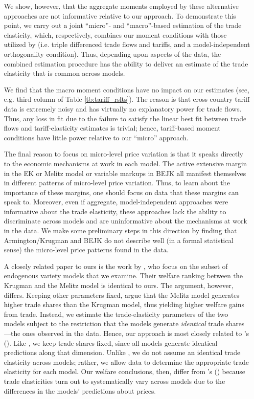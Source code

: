 \documentclass[12pt,dvips, ps2pdf]{article}
\def\citeapos#1{\citeauthor{#1}'s (\citeyear{#1})}
\begin{document}
We show, however, that the aggregate moments employed by these alternative approaches are not informative relative to our approach. To demonstrate this point, we carry out a joint ``micro''- and ``macro''-based estimation of the trade elasticity, which, respectively, combines our moment conditions with those utilized by \citet{caliendo2010} (i.e. triple differenced trade flows and tariffs, and a model-independent orthogonality condition). Thus, depending upon aspects of the data, the combined estimation procedure has the ability to deliver an estimate of the trade elasticity that is common across models.

We find that the macro moment conditions have no impact on our estimates (see, e.g. third column of Table \ref{tb:tariff_rslts}). The reason is that cross-country tariff data is extremely noisy and has virtually no explanatory power for trade flows. Thus, any loss in fit due to the failure to satisfy the linear best fit between trade flows and tariff-elasticity estimates is trivial; hence, tariff-based moment conditions have little power relative to our ``micro'' approach.

The final reason to focus on micro-level price variation is that it speaks directly to the economic mechanisms at work in each model. The active extensive margin in the EK or Melitz model or variable markups in BEJK all manifest themselves in different patterns of micro-level price variation. Thus, to learn about the importance of these margins, one should focus on data that these margins can speak to. Moreover, even if aggregate, model-independent approaches were informative about the trade elasticity, these approaches lack the ability to discriminate across models and are uninformative about the mechanisms at work in the data. We make some preliminary steps in this direction by finding that Armington/Krugman and BEJK do not describe well (in a formal statistical sense) the micro-level price patterns found in the data.

A closely related paper to ours is the work by \citet{melitz_redding}, who focus on the subset of endogenous variety models that we examine. Their welfare ranking between the Krugman and the Melitz model is identical to ours. The argument, however, differs. Keeping other parameters fixed, \citet{melitz_redding} argue that the Melitz model generates higher trade shares than the Krugman model, thus yielding higher welfare gains from trade. Instead, we estimate the trade-elasticity parameters of the two models subject to the restriction that the models generate \emph{identical} trade shares---the ones observed in the data. Hence, our approach is most closely related to \citeapos{acr09}. Like \citet{acr09}, we keep trade shares fixed, since all models generate identical predictions along that dimension. Unlike \citet{acr09}, we do not assume an identical trade elasticity across models; rather, we allow data to determine the appropriate trade elasticity for each model. Our welfare conclusions, then, differ from \citeapos{acr09} because trade elasticities turn out to systematically vary across models due to the differences in the models' predictions about prices.
\end{document}
